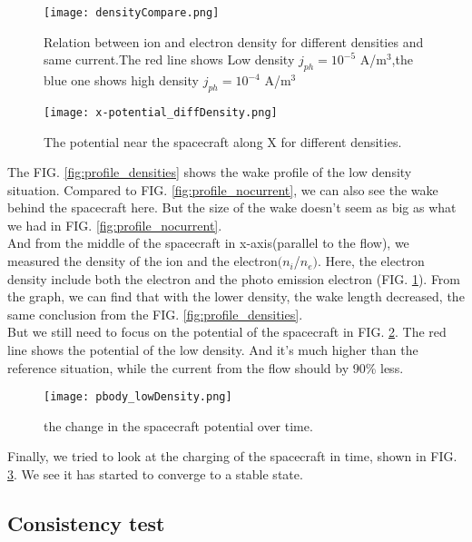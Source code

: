 \documentclass[aip, 
rsi, 
amsmath,
amssymb,
longbibliography,
preprint]{revtex4-1}
\begin{document}
\begin{figure}[!ht]
\texttt{[image: densityCompare.png]}
\caption{Relation between ion and electron density for different densities and same current.The red line shows Low density $j_{ph} = 10^{-5}$ A/m$^3$,the blue one shows high density $j_{ph} = 10^{-4}$ A/m$^3$} \label{fig:densitycompare}
\end{figure}

\begin{figure}[!ht]
\texttt{[image: x-potential\_diffDensity.png]}
\caption{The potential near the spacecraft along X for different densities. \label{fig:end}}
\end{figure}

The FIG. \ref{fig:profile_densities} shows the wake profile of the low density situation. Compared to FIG. \ref{fig:profile_nocurrent}, we can also see the wake behind the spacecraft here. But the size of the wake doesn't seem as big as what we had in FIG. \ref{fig:profile_nocurrent}.\\

And from the middle of the spacecraft in x-axis(parallel to the flow), we measured the density of the ion and the electron$(n_i$/$n_e)$. Here, the electron density include both the electron and the photo emission electron (FIG. \ref{fig:densitycompare}). From the graph, we can find that with the lower density, the wake length decreased, the same conclusion from the FIG. \ref{fig:profile_densities}.\\

But we still need to focus on the potential of the spacecraft in FIG. \ref{fig:end}. The red line shows the potential of the low density. And it's much higher than the reference situation, while the current from the flow should by 90\% less.

\begin{figure}[!ht]
\texttt{[image: pbody\_lowDensity.png]}
\caption{the change in the spacecraft potential over time.\label{fig:DensityTime}}
\end{figure}

Finally, we tried to look at the charging of the spacecraft in time, shown in FIG. \ref{fig:DensityTime}. We see it has started to converge to a stable state.

\subsection{Consistency test}
\end{document}

